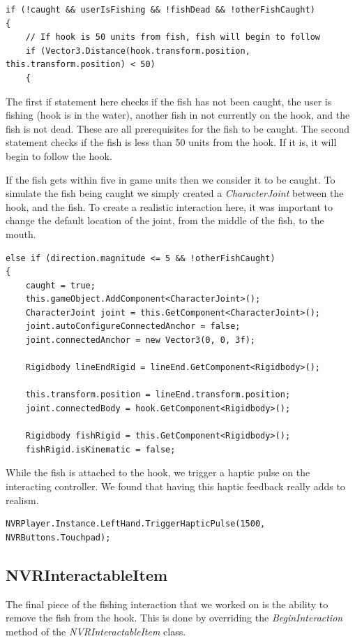 \documentclass[10pt,journal,compsoc,onecolumn, draftclsnofoot]{IEEEtran}
\begin{document}
\begin{lstlisting}[language={[Sharp]C}]
if (!caught && userIsFishing && !fishDead && !otherFishCaught)
{
	// If hook is 50 units from fish, fish will begin to follow
	if (Vector3.Distance(hook.transform.position, this.transform.position) < 50)
	{
\end{lstlisting}

The first if statement here checks if the fish has not been caught, the user is fishing (hook is in the water), another fish in not currently on the hook, and the fish is not dead. These are all prerequisites for the fish to be caught. The second statement checks if the fish is less than 50 units from the hook. If it is, it will begin to follow the hook.

If the fish gets within five in game units then we consider it to be caught. To simulate the fish being caught we simply created a \textit{CharacterJoint} between the hook, and the fish. To create a realistic interaction here, it was important to change the default location of the joint, from the middle of the fish, to the mouth.

\begin{lstlisting}[language={[Sharp]C}]
else if (direction.magnitude <= 5 && !otherFishCaught)
{
	caught = true;
	this.gameObject.AddComponent<CharacterJoint>();
	CharacterJoint joint = this.GetComponent<CharacterJoint>();
	joint.autoConfigureConnectedAnchor = false;
	joint.connectedAnchor = new Vector3(0, 0, 3f);

	Rigidbody lineEndRigid = lineEnd.GetComponent<Rigidbody>();

	this.transform.position = lineEnd.transform.position;
	joint.connectedBody = hook.GetComponent<Rigidbody>();

	Rigidbody fishRigid = this.GetComponent<Rigidbody>();
	fishRigid.isKinematic = false;
\end{lstlisting}

While the fish is attached to the hook, we trigger a haptic pulse on the interacting controller. We found that having this haptic feedback really adds to realism.

\begin{lstlisting}[language={[Sharp]C}]
NVRPlayer.Instance.LeftHand.TriggerHapticPulse(1500, NVRButtons.Touchpad);
\end{lstlisting}

\subsection{NVRInteractableItem}
The final piece of the fishing interaction that we worked on is the ability to remove the fish from the hook. This is done by overriding the \textit{BeginInteraction} method of the \textit{NVRInteractableItem} class.
\end{document}
